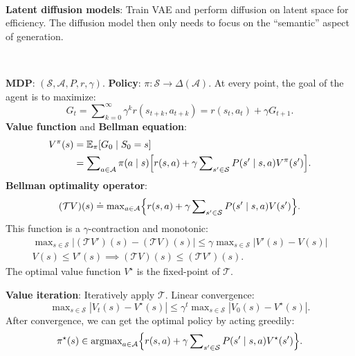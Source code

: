 \documentclass{article}
\DeclareMathOperator*{\argmax}{argmax}
\newcommand{\lft}{\mathopen{}\mathclose\bgroup\left}
\newcommand{\rgt}{\aftergroup\egroup\right}
\newcommand{\E}{\mathbb{E}}
\newenvironment{topic}[1]
{\textbf{\sffamily \colorbox{black}{\rlap{\textbf{\textcolor{white}{#1}}}\hspace{\linewidth}\hspace{-2\fboxsep}}} \\ \vspace{0.2cm}}
{}
\begin{document}
\begin{multicols*}{2}
\begin{topic}{Diffusion models}
        \textbf{Latent diffusion models}: Train VAE and perform diffusion on latent space for
        efficiency. The diffusion model then only needs to focus on the ``semantic'' aspect of
        generation.

    \end{topic}

    \begin{topic}{Reinforcement learning}

        \textbf{MDP}: $(\mathcal{S}, \mathcal{A}, P, r, \gamma)$. \textbf{Policy}: $\pi: \mathcal{S} \to
            \Delta(\mathcal{A})$. At every point, the goal of the agent is to maximize: \[
            G_t = \sum\nolimits_{k=0}^{\infty} \gamma^k r(s_{t+k}, a_{t+k}) = r(s_t, a_t) + \gamma G_{t+1}.
        \]
        \textbf{Value function} and \textbf{Bellman equation}:
        \begin{align*}
            V^\pi(s) & = \E_{\pi} [G_0 \mid S_0 = s]                                                                                                               \\
                     & = \sum\nolimits_{a \in \mathcal{A}} \pi(a \mid s) \lft[ r(s,a) + \gamma \sum\nolimits_{s' \in \mathcal{S}} P(s' \mid s, a) V^\pi(s') \rgt].
        \end{align*}
        \textbf{Bellman optimality operator}: \[
            (\mathcal{T} V) (s) \doteq \max\nolimits_{a \in \mathcal{A}} \lft\{ r(s,a) + \gamma \sum\nolimits_{s' \in \mathcal{S}} P(s' \mid s, a) V(s') \rgt\}.
        \]
        This function is a $\gamma$-contraction and monotonic:
        \begin{gather*}
            \max\nolimits_{s \in \mathcal{S}} |(\mathcal{T}V')(s) - (\mathcal{T}V)(s)| \leq \gamma \max\nolimits_{s \in \mathcal{S}} |V'(s) - V(s)| \\
            V(s) \leq V'(s) \implies (\mathcal{T}V)(s) \leq (\mathcal{T}V')(s).
        \end{gather*}
        The optimal value function $V^\star$ is the fixed-point of $\mathcal{T}$.

        \textbf{Value iteration}: Iteratively apply $\mathcal{T}$. Linear convergence: \[
            \max\nolimits_{s \in \mathcal{S}} |V_t(s) - V^\star(s)| \leq \gamma^t \max\nolimits_{s \in \mathcal{S}} |V_0(s) - V^\star(s)|.
        \]
        After convergence, we can get the optimal policy by acting greedily: \[
            \pi^\star(s) \in \argmax\nolimits_{a \in \mathcal{A}} \lft\{ r(s,a) + \gamma \sum\nolimits_{s' \in \mathcal{S}} P(s' \mid s, a) V^\star(s') \rgt\}.
        \]


\end{topic}
\end{multicols*}
\end{document}
